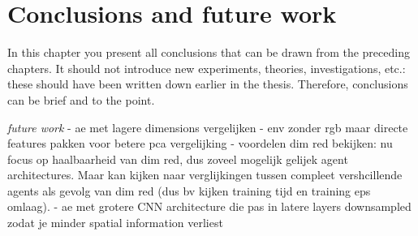 \chapter{Conclusions and future work}\label{conclusions}
In this chapter you present all conclusions that can be drawn from the
preceding chapters.
It should not introduce new experiments, theories, investigations, etc.:
these should have been written down earlier in the thesis.
Therefore, conclusions can be brief and to the point.

\emph{future work}
- ae met lagere dimensions vergelijken
- env zonder rgb maar directe features pakken voor betere pca vergelijking
- voordelen dim red bekijken: nu focus op haalbaarheid van dim red, dus zoveel mogelijk gelijek agent architectures. Maar kan kijken naar verglijkingen tussen compleet vershcillende agents als gevolg van dim red (dus bv kijken training tijd en training eps omlaag).
- ae met grotere CNN architecture die pas in latere layers downsampled zodat je minder spatial information verliest